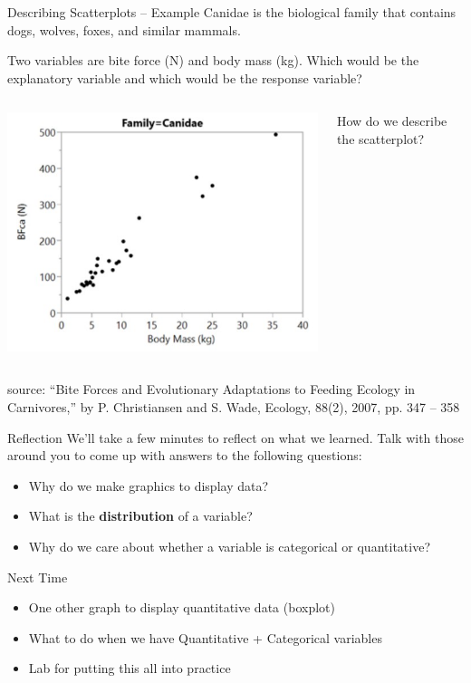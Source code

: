 \documentclass{beamer}
\begin{document}
\begin{frame}{Describing Scatterplots -- Example}
Canidae is the biological family that contains dogs, wolves, foxes, and similar mammals.

Two variables are bite force (N) and body mass (kg). Which would be the explanatory variable and 
which would be the response variable?

\begin{columns}
  \begin{column}{0.5\textwidth}
  \includegraphics[scale=.65]{img/CanidaeScatterplot.jpg}
  \end{column}
  \begin{column}{0.4\textwidth}
  How do we describe the scatterplot?
  \end{column}
\end{columns}
{\tiny source: “Bite Forces and Evolutionary Adaptations to Feeding Ecology in Carnivores,” by P. Christiansen and S. Wade, Ecology, 88(2), 2007, pp. 347 – 358}

\end{frame}

\begin{frame}{Reflection}
We'll take a few minutes to reflect on what we learned. Talk with those around you to come up with answers to the following questions: \vspace{2mm}

\begin{itemize}
    \item Why do we make graphics to display data?
    \item What is the \textbf{distribution} of a variable?
    \item Why do we care about whether a variable is categorical or quantitative?
\end{itemize}
\end{frame}

\begin{frame}{Next Time}
    \begin{itemize}
        \item One other graph to display quantitative data (boxplot) \vspace{4mm}
        \item What to do when we have Quantitative + Categorical variables \vspace{4mm}
        \item Lab for putting this all into practice
    \end{itemize}
\end{frame}
\end{document}
